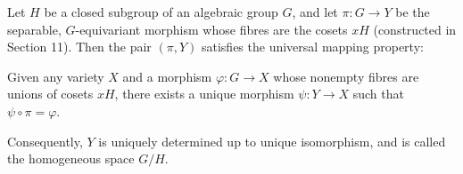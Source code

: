 Let $H$ be a closed subgroup of an algebraic group $G$, and let $\pi: G \to Y$ be the separable, $G$-equivariant morphism whose fibres are the cosets $xH$ (constructed in Section 11). Then the pair $(\pi, Y)$ satisfies the universal mapping property:

Given any variety $X$ and a morphism $\varphi: G \to X$ whose nonempty fibres are unions of cosets $xH$, there exists a unique morphism $\psi: Y \to X$ such that $\psi \circ \pi = \varphi$.

Consequently, $Y$ is uniquely determined up to unique isomorphism, and is called the homogeneous space $G/H$.
